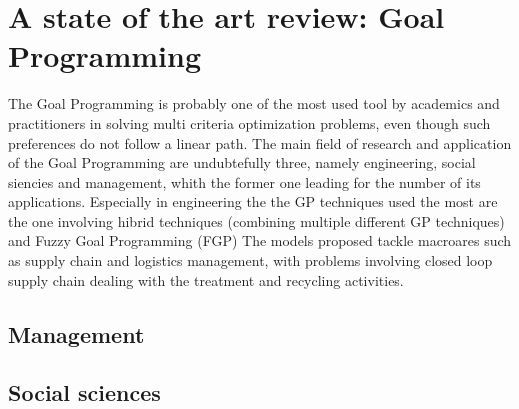 \documentclass{article}
\begin{document}
\pagebreak 

\section{A state of the art review: Goal Programming}
The Goal Programming is probably one of the most used tool by academics and practitioners in solving multi criteria optimization problems, even though such preferences do not follow a linear path\cite{Romero2014}\cite{Schniederjans1995}. The main field of research and application of the Goal Programming are undubtefully three, namely engineering, social siencies and management\cite{colapinto_multi-criteria_2017}, whith the former one leading for the number of its applications.
Especially in engineering the the GP techniques used the most are the one involving hibrid techniques (combining multiple different GP techniques) and Fuzzy Goal Programming (FGP) The models proposed tackle macroares such as supply chain and logistics management, with problems involving closed loop supply chain dealing with the treatment and recycling activities\cite{Inserirezarandi}. 
\subsection{Management}

\subsection{Social sciences}
\end{document}
